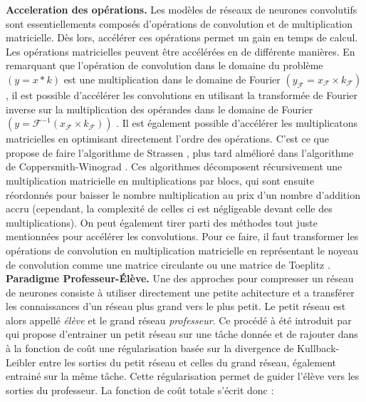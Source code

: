 \noindent \textbf{Acceleration des opérations.} Les modèles de réseaux de
neurones convolutifs sont essentiellements composés d'opérations de convolution
et de multiplication matricielle. Dès lors, accélérer ces opérations permet un
gain en temps de calcul. Les opérations matricielles peuvent être accélérées en
de différente manières. En remarquant que l'opération de convolution dans le
domaine du problème $(y = x * k)$ est une multiplication dans le domaine de
Fourier $(y_{\mathcal{F}} = x_{\mathcal{F}} \times k_{\mathcal{F}})$, il est
possible d'accélérer les convolutions en utilisant la transformée de Fourier
inverse sur la multiplication des opérandes dans le domaine de Fourier $(y =
\mathcal{F}^{-1} (x_{\mathcal{F}} \times k_{\mathcal{F}}))$
\cite{DBLP:conf/nips/ChiJM20,DBLP:journals/npl/LinY19,DBLP:conf/pkdd/PrattWCZ17}.
Il est également possible d'accélérer les multiplicatons matricielles en
optimisant directement l'ordre des opérations. C'est ce que propose de faire
l'algorithme de Strassen \cite{strassen1969gaussian}, plus tard almélioré dans
l'algorithme de Coppersmith-Winograd \cite{coppersmith1987matrix}. Ces
algorithmes décomposent récursivement une multiplication matricielle en
multiplications par blocs, qui sont ensuite réordonnés pour baisser le nombre
multiplication au prix d'un nombre d'addition accru (cependant, la complexité de
celles ci est négligeable devant celle des multiplications). On peut également
tirer parti des méthodes tout juste mentionnées pour accélérer les convolutions.
Pour ce faire, il faut transformer les opérations de convolution en
multiplication matricielle en représentant le noyeau de convolution comme une
matrice circulante \cite{DBLP:conf/iccv/ChengYFKCC15} ou une matrice de Toeplitz
\cite{gray2006toeplitz,liao2019compressing}.\\

\noindent \textbf{Paradigme Professeur-Élève.} Une des approches pour compresser
un réseau de neurones consiste à utiliser directement une petite achitecture et
a transférer les connaissances d'un réseau plus grand vers le plus petit. Le
petit réseau est alors appellé \emph{élève} et le grand réseau
\emph{professeur}. Ce procédé à été introduit par
\cite{DBLP:journals/corr/HintonVD15} \cite{DBLP:journals/corr/HintonVD15} qui
propose d'entrainer un petit réseau sur une tâche donnée et de rajouter dans à
la fonction de coût une régularisation basée sur la divergence de
Kullback-Leibler entre les sorties du petit réseau et celles du grand réseau,
également entrainé sur la même tâche. Cette régularisation permet de guider
l'élève vers les sorties du professeur. La fonction de coût totale s'écrit donc
:\\

